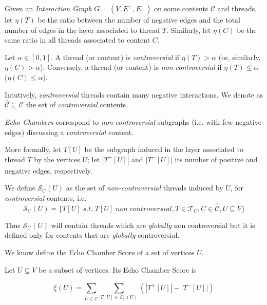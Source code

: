 \bigskip

Given an \emph{Interaction Graph} $G = (V, E^{+}, E^{-})$ on some contents
$\mathcal{C} $ and threads, let $\eta(T)$ be the ratio between the number of
negative edges and the total number of edges in the layer associated to thread
$T$. Similarly, let $\eta(C)$ be the same ratio in all threads associated to
content $C$.

\begin{definition}
	Let $\alpha \in [0,1]$. A thread (or content) is \emph{controversial} if
	$\eta(T) > \alpha$ (or, similarly, $\eta(C) > \alpha $). Conversely, a
	thread (or content) is \emph{non-controversial} if $\eta(T) \leq \alpha$
	($\eta(C) \leq \alpha$).
\end{definition}

Intutively, \emph{controversial} threads contain many negative
interactions. We denote as $\hat{\mathcal{C} } \subseteq \mathcal{C} $ the
set of \emph{controversial} contents.

\medskip

\emph{Echo Chambers} correspond to \emph{non-controversial} subgraphs
(i.e. with few negative edges) discussing a
\emph{controversial} content.

More formally, let $T[U]$ be the subgraph induced in the layer associated to
thread $T$ by the vertices $U$; let $|T^{+} [U]|$ and $|T^{-} [U]|$ its number
of positive and negative edges, respectively.

We define $\mathcal{S}_C (U)$ as the set of \emph{non-controversial} threads
induced by $U$, for \textit{controversial} contents, i.e.
	{\small
		\begin{equation}
			\mathcal{S} _{C} (U) = \{ T[U] \; s.t. \; T[U] \; non \;
			controversial, T \in \mathcal{T} _{C}, C
			\in \hat{\mathcal{C}}, U \subseteq V\}
		\end{equation}
	}

Thus $\mathcal{S} _C (U)$ will contain threads which are \emph{globally} non
controversial but it is defined only for contents that are \emph{globally}
controversial.

\medskip

We know define the Echo Chamber Score of a set of vertices $U$.

\begin{definition}
	Let $U \subseteq V$ be a subset of vertices. Its Echo Chamber Score is

	\begin{equation}
		\label{eq:echo-chamber-score}
		\xi(U) = \sum^{}_{\mathcal{C} \in \mathcal{\hat{C}}} \sum^{}_{T[U] \in
		\mathcal{S} _{C} (U)} (|T^{+} [U]| - |T ^{-} [U]|)
	\end{equation}
\end{definition}

